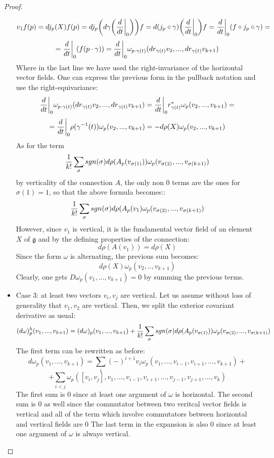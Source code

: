 \documentclass[12pt,a4paper]{report}
\theoremstyle{definition}
\theoremstyle{Theorem}
\theoremstyle{definition}
\theoremstyle{definition}
\begin{document}
\begin{proof}
\begin{itemize}
			$$v_1f(p)=dj_p(X)f(p)=dj_p\bigg( d\gamma\bigg({d\over dt}\bigg|_0\bigg)\bigg)f=d(j_p\circ \gamma)\bigg({d\over dt}\bigg|_0\bigg)f={d\over dt}\bigg|_0 (f\circ j_p\circ \gamma)=$$
			$$={d\over dt}\bigg|_0(f(p\cdot \gamma))={d\over dt}\bigg|_0\omega_{p\cdot \gamma(t)}(dr_{\gamma(t)}v_2,...,dr_{\gamma(t)}v_{k+1})$$
			Where in the last line we have used the right-invariance of the horizontal vector fields. One can express the previous form in the pullback notation and use the right-equivariance:
			$${d\over dt}\bigg|_0\omega_{p\cdot \gamma(t)}(dr_{\gamma(t)}v_2,...,dr_{\gamma(t)}v_{k+1})={d\over dt}\bigg|_0r^*_{\gamma(t)}\omega_{p}(v_2,...,v_{k+1})=$$
			$$={d\over dt}\bigg|_0\rho(\gamma^{-1}(t))\omega_{p}(v_2,...,v_{k+1})=-d\rho(X)\omega_{p}(v_2,...,v_{k+1})$$
			As for the term
			$${1\over k!}\sum_\sigma sgn(\sigma)d\rho(A_p(v_{\sigma(1)}))\omega_p(v_{\sigma(2)},...,v_{\sigma(k+1)})$$
			by verticality of the connection $A$, the only non 0 terms are the ones for $\sigma(1)=1$, so that the above formula becomes::
			$${1\over k!}\sum_\sigma sgn(\sigma)d\rho(A_p(v_1)\omega_p(v_{\sigma(2)},...,v_{\sigma(k+1)})$$
			However, since $v_1$ is vertical, it is the fundamental vector field of an element $X$ of $\mathfrak{g}$ and by the defining properties of the connection:
			$$d\rho(A(v_1))=d\rho(X)$$
			Since the form $\omega$ is alternating, the previous sum becomes:
			$$d\rho(X)\omega_p(v_2,..,v_{k+1})$$
			Clearly, one gets $D\omega_p(v_1,...,v_{k+1})=0$ by summing the previous terms.
			\item Case 3: at least two vectors $v_i,v_j$ are vertical. Let us assume without loss of generality that $v_1,v_2$ are vertical. Then, we split the exterior covariant derivative as usual:
			$$(d\omega)^h_p(v_1,...,v_{k+1})=(d\omega)_p(v_1,...,v_{k+1})+{1\over k!}\sum_\sigma sgn(\sigma)d\rho(A_p(v_{\sigma(1)}))\omega_p(v_{\sigma(2)},...,v_{\sigma(k+1)})$$
			The first term can be rewritten as before:
			$$d\omega_p(v_1,...,v_{k+1})=\sum_i (-)^{i+1}v_i\omega_p(v_1,...,v_{i-1},v_{i+1},...,v_{k+1})+$$
			$$+\sum_{i<j}\omega_p([v_i,v_j],v_1,...,v_{i-1},v_{i+1},...,v_{j-1},v_{j+1},...,v_k)$$
			The first sum is 0 since at least one argument of $\omega$ is horizontal. The second sum is 0 as well since the commutator between two veritcal vector fields is vertical and all of the term which involve commutators between horizontal and vertical fields are 0
			The last term in the expansion is also 0 since at least one argument of $\omega$ is always vertical.
		\end{itemize}
	\end{proof}
\end{document}
